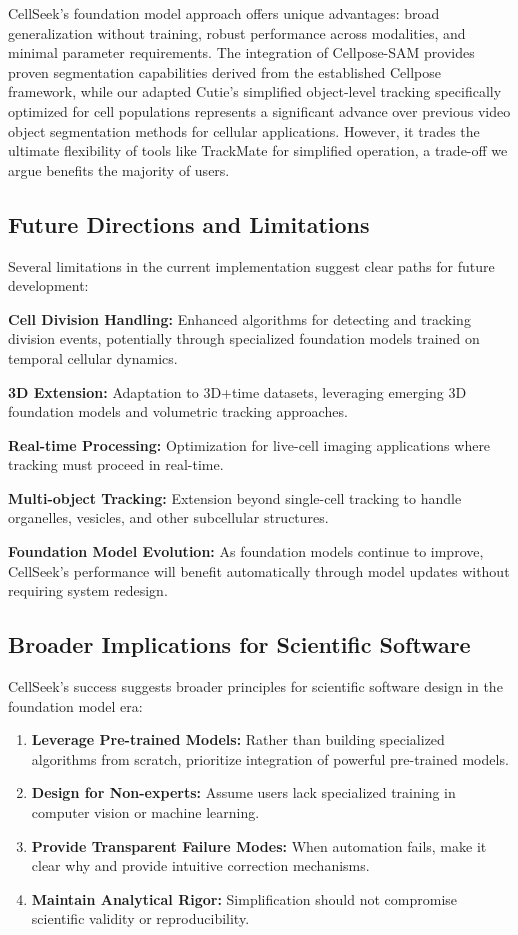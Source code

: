 \documentclass[12pt]{article}
\begin{document}
CellSeek's foundation model approach offers unique advantages: broad generalization without training, robust performance across modalities, and minimal parameter requirements. The integration of Cellpose-SAM provides proven segmentation capabilities derived from the established Cellpose framework, while our adapted Cutie's simplified object-level tracking specifically optimized for cell populations represents a significant advance over previous video object segmentation methods for cellular applications. However, it trades the ultimate flexibility of tools like TrackMate for simplified operation, a trade-off we argue benefits the majority of users.

\subsection{Future Directions and Limitations}

Several limitations in the current implementation suggest clear paths for future development:

\textbf{Cell Division Handling:} Enhanced algorithms for detecting and tracking division events, potentially through specialized foundation models trained on temporal cellular dynamics.

\textbf{3D Extension:} Adaptation to 3D+time datasets, leveraging emerging 3D foundation models and volumetric tracking approaches.

\textbf{Real-time Processing:} Optimization for live-cell imaging applications where tracking must proceed in real-time.

\textbf{Multi-object Tracking:} Extension beyond single-cell tracking to handle organelles, vesicles, and other subcellular structures.

\textbf{Foundation Model Evolution:} As foundation models continue to improve, CellSeek's performance will benefit automatically through model updates without requiring system redesign.

\subsection{Broader Implications for Scientific Software}

CellSeek's success suggests broader principles for scientific software design in the foundation model era:

\begin{enumerate}
  \item \textbf{Leverage Pre-trained Models:} Rather than building specialized algorithms from scratch, prioritize integration of powerful pre-trained models.
  \item \textbf{Design for Non-experts:} Assume users lack specialized training in computer vision or machine learning.
  \item \textbf{Provide Transparent Failure Modes:} When automation fails, make it clear why and provide intuitive correction mechanisms.
  \item \textbf{Maintain Analytical Rigor:} Simplification should not compromise scientific validity or reproducibility.
\end{enumerate}
\end{document}
